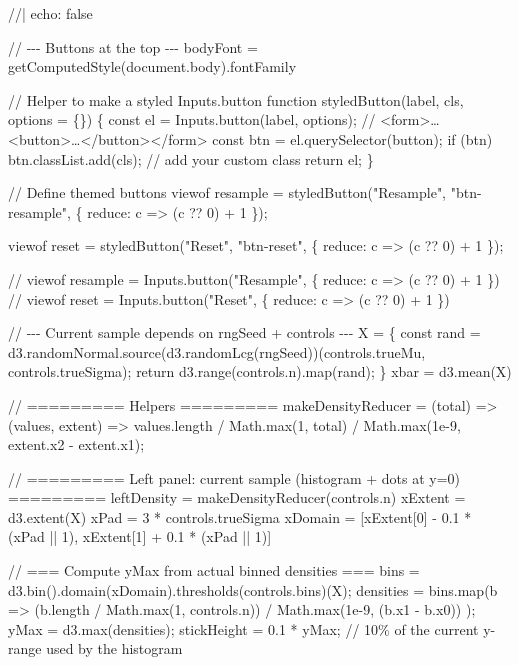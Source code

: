 \documentclass[
  letterpaper,
  DIV=11,
  numbers=noendperiod]{scrreprt}
\newenvironment{Shaded}{\begin{snugshade}}{\end{snugshade}}
\newcommand{\NormalTok}[1]{\textcolor[rgb]{0.00,0.23,0.31}{#1}}
\theoremstyle{definition}
\theoremstyle{plain}
\theoremstyle{definition}
\theoremstyle{remark}
\begin{document}
\begin{Shaded}
\begin{Highlighting}[]
\NormalTok{//| echo: false}

\NormalTok{// {-}{-}{-} Buttons at the top {-}{-}{-}}
\NormalTok{bodyFont = getComputedStyle(document.body).fontFamily}

\NormalTok{// Helper to make a styled Inputs.button}
\NormalTok{function styledButton(label, cls, options = \{\}) \{}
\NormalTok{  const el = Inputs.button(label, options);              // \textless{}form\textgreater{}…\textless{}button\textgreater{}…\textless{}/button\textgreater{}\textless{}/form\textgreater{}}
\NormalTok{  const btn = el.querySelector(\textquotesingle{}button\textquotesingle{});}
\NormalTok{  if (btn) btn.classList.add(cls);                       // add your custom class}
\NormalTok{  return el;}
\NormalTok{\}}

\NormalTok{// Define themed buttons}
\NormalTok{viewof resample = styledButton("Resample", "btn{-}resample", \{}
\NormalTok{  reduce: c =\textgreater{} (c ?? 0) + 1}
\NormalTok{\});}

\NormalTok{viewof reset = styledButton("Reset", "btn{-}reset", \{}
\NormalTok{  reduce: c =\textgreater{} (c ?? 0) + 1}
\NormalTok{\});}


\NormalTok{// viewof resample = Inputs.button("Resample", \{ reduce: c =\textgreater{} (c ?? 0) + 1 \}) }
\NormalTok{// viewof reset = Inputs.button("Reset", \{ reduce: c =\textgreater{} (c ?? 0) + 1 \})}

\NormalTok{// {-}{-}{-} Current sample depends on rngSeed + controls {-}{-}{-}}
\NormalTok{X = \{}
\NormalTok{  const rand = d3.randomNormal.source(d3.randomLcg(rngSeed))(controls.trueMu, controls.trueSigma);}
\NormalTok{  return d3.range(controls.n).map(rand);}
\NormalTok{\}}
\NormalTok{xbar = d3.mean(X)}

\NormalTok{// ========= Helpers =========}
\NormalTok{makeDensityReducer = (total) =\textgreater{} (values, extent) =\textgreater{}}
\NormalTok{  values.length / Math.max(1, total) / Math.max(1e{-}9, extent.x2 {-} extent.x1);}

\NormalTok{// ========= Left panel: current sample (histogram + dots at y=0) =========}
\NormalTok{leftDensity = makeDensityReducer(controls.n)}
\NormalTok{xExtent = d3.extent(X)}
\NormalTok{xPad = 3 * controls.trueSigma}
\NormalTok{xDomain = [xExtent[0] {-} 0.1 * (xPad || 1), xExtent[1] + 0.1 * (xPad || 1)]}

\NormalTok{// === Compute yMax from actual binned densities ===}
\NormalTok{bins = d3.bin().domain(xDomain).thresholds(controls.bins)(X);}
\NormalTok{densities = bins.map(b =\textgreater{}}
\NormalTok{  (b.length / Math.max(1, controls.n)) / Math.max(1e{-}9, (b.x1 {-} b.x0))}
\NormalTok{);}
\NormalTok{yMax = d3.max(densities);}
\NormalTok{stickHeight = 0.1 * yMax; // 10\% of the current y{-}range used by the histogram}


\end{Highlighting}
\end{Shaded}
\end{document}
